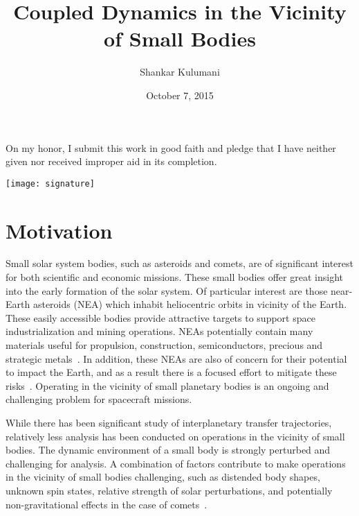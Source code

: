 \documentclass[11pt,draft]{article} %
\title{Coupled Dynamics in the Vicinity of Small Bodies}
\author{Shankar Kulumani}
\date{October 7, 2015}
\begin{document}
\makeatletter
\begin{titlepage}
	\centering
	\LARGE{\@title \par} 
	\vspace{1cm}
	\Large{\@date \par}
	\vfill
	\Large{On my honor, I submit this work in good faith and pledge that I have neither given nor received improper aid in its completion. \par}
	\vspace{1cm}
	\Large{\@author \par}
	\vspace{1cm}
	\texttt{[image: signature]}\\
	\vspace{-0.5cm}
	\makebox[2.5in]{\hrulefill}
\end{titlepage}
\makeatother
\section{Motivation}

Small solar system bodies, such as asteroids and comets, are of significant interest for both scientific and economic missions.
These small bodies offer great insight into the early formation of the solar system.
Of particular interest are those near-Earth asteroids (NEA) which inhabit heliocentric orbits in vicinity of the Earth.
These easily accessible bodies provide attractive targets to support space industrialization and mining operations.
NEAs potentially contain many materials useful for propulsion, construction, semiconductors, precious and strategic metals~\cite{ross2001}.
In addition, these NEAs are also of concern for their potential to impact the Earth, and as a result there is a focused effort to mitigate these risks~\cite{wie2008}.
Operating in the vicinity of small planetary bodies is an ongoing and challenging problem for spacecraft missions.

While there has been significant study of interplanetary transfer trajectories, relatively less analysis has been conducted on operations in the vicinity of small bodies.
The dynamic environment of a small body is strongly perturbed and challenging for analysis.
A combination of factors contribute to make operations in the vicinity of small bodies challenging, such as distended body shapes, unknown spin states, relative strength of solar perturbations, and potentially non-gravitational effects in the case of comets~\cite{scheeres2012}.
\end{document}
